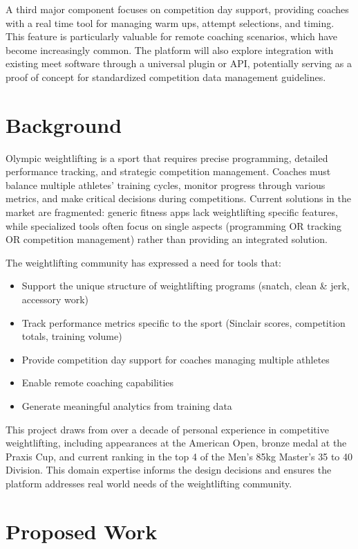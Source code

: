 \documentclass[11pt, oneside]{article}   	%
\begin{document}
A third major component focuses on competition day support, providing coaches with a real time tool for managing warm ups, attempt selections, and timing. This feature is particularly valuable for remote coaching scenarios, which have become increasingly common. The platform will also explore integration with existing meet software through a universal plugin or API, potentially serving as a proof of concept for standardized competition data management guidelines.

\section*{Background}

Olympic weightlifting is a sport that requires precise programming, detailed performance tracking, and strategic competition management. Coaches must balance multiple athletes' training cycles, monitor progress through various metrics, and make critical decisions during competitions. Current solutions in the market are fragmented: generic fitness apps lack weightlifting specific features, while specialized tools often focus on single aspects (programming OR tracking OR competition management) rather than providing an integrated solution.

The weightlifting community has expressed a need for tools that:
\begin{itemize}
    \item Support the unique structure of weightlifting programs (snatch, clean \& jerk, accessory work)
    \item Track performance metrics specific to the sport (Sinclair scores, competition totals, training volume)
    \item Provide competition day support for coaches managing multiple athletes
    \item Enable remote coaching capabilities
    \item Generate meaningful analytics from training data
\end{itemize}

This project draws from over a decade of personal experience in competitive weightlifting, including appearances at the American Open, bronze medal at the Praxis Cup, and current ranking in the top 4 of the Men's 85kg Master's 35 to 40 Division. This domain expertise informs the design decisions and ensures the platform addresses real world needs of the weightlifting community.

\section*{Proposed Work}
\end{document}
